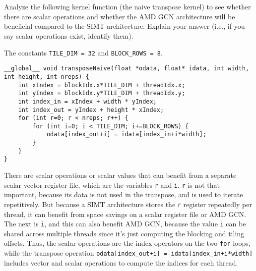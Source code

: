 \documentclass[11pt]{article}
\begin{document}
\section{}

Analyze the following kernel function (the naive transpose kernel) to see whether there are scalar operations and whether the AMD GCN architecture will be beneficial compared to the SIMT architecture. Explain your answer (i.e., if you say scalar operations exist, identify them). 

The constants \verb|TILE_DIM = 32| and \verb|BLOCK_ROWS = 8|.
\begin{verbatim}
__global__ void transposeNaive(float *odata, float* idata, int width, int height, int nreps) {
    int xIndex = blockIdx.x*TILE_DIM + threadIdx.x;
    int yIndex = blockIdx.y*TILE_DIM + threadIdx.y;
    int index_in = xIndex + width * yIndex;
    int index_out = yIndex + height * xIndex;
    for (int r=0; r < nreps; r++) {
        for (int i=0; i < TILE_DIM; i+=BLOCK_ROWS) {
            odata[index_out+i] = idata[index_in+i*width];
        }
    }
}
\end{verbatim}

\begin{Answer}
There are scalar operations or scalar values that can benefit from a separate scalar vector register file, which are the variables \verb|r| and \verb|i|. \verb|r| is not that important, because its data is not used in the transpose, and is used to iterate repetitively. But because a SIMT architecture stores the \verb|r| register repeatedly per thread, it can benefit from space savings on a scalar register file or AMD GCN. The next is \verb|i|, and this can also benefit AMD GCN, because the value \verb|i| can be shared across multiple threads since it's just computing the blocking and tiling offsets. Thus, the scalar operations are the index operators on the two \verb|for| loops, while the transpose operation \verb|odata[index_out+i] = idata[index_in+i*width]| includes vector and scalar operations to compute the indices for each thread.
\end{Answer}
\end{document}
